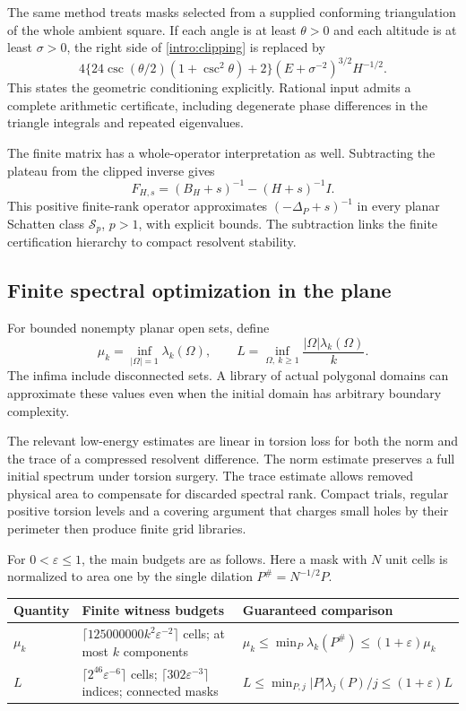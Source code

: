 \documentclass[11pt,reqno]{amsart}
\numberwithin{equation}{section}
\newcommand{\abs}[1]{\lvert#1\rvert}
\begin{document}
The same method treats masks selected from a supplied conforming
triangulation of the whole ambient square. If each angle is at least
\(\theta>0\) and each altitude is at least \(\sigma>0\), the right
side of \eqref{intro:clipping} is replaced by
\[
 4\{24\csc(\theta/2)(1+\csc^2\theta)+2\}
       (E+\sigma^{-2})^{3/2}H^{-1/2}.
\]
This states the geometric conditioning explicitly. Rational input
admits a complete arithmetic certificate, including degenerate phase
differences in the triangle integrals and repeated eigenvalues.

The finite matrix has a whole-operator interpretation as well.
Subtracting the plateau from the clipped inverse gives
\[
 F_{H,s}=(B_H+s)^{-1}-(H+s)^{-1}I.
\]
This positive finite-rank operator approximates
\((-\Delta_P+s)^{-1}\) in every planar Schatten class
\(\mathcal S_p\), \(p>1\), with explicit bounds. The subtraction
links the finite certification hierarchy to compact resolvent
stability.

\subsection*{Finite spectral optimization in the plane}

For bounded nonempty planar open sets, define
\begin{equation}\label{intro:optima}
 \mu_k=\inf_{\abs\Omega=1}\lambda_k(\Omega),\qquad
 L=\inf_{\Omega,\ k\ge1}
          \frac{\abs\Omega\lambda_k(\Omega)}{k}.
\end{equation}
The infima include disconnected sets. A library of actual
polygonal domains can approximate these values even when the
initial domain has arbitrary boundary complexity.

The relevant low-energy estimates are linear in torsion loss for
both the norm and the trace of a compressed resolvent difference.
The norm estimate preserves a full initial spectrum under torsion
surgery. The trace estimate allows removed physical area to
compensate for discarded spectral rank. Compact trials, regular
positive torsion levels and a covering argument that charges small
holes by their perimeter then produce finite grid libraries.

For \(0<\varepsilon\le1\), the main budgets are as follows.
Here a mask with \(N\) unit cells is normalized to area one by
the single dilation \(P^\#=N^{-1/2}P\).
\begin{center}
\small
\begin{tabular}{@{}p{}p{}p{}@{}}
\toprule
Quantity & Finite witness budgets & Guaranteed comparison\\
\midrule
\(\mu_k\) &
\(\lceil125000000k^2\varepsilon^{-2}\rceil\) cells;
at most \(k\) components &
\(\mu_k\le\min_P\lambda_k(P^\#)\le(1+\varepsilon)\mu_k\)\\[5pt]
\(L\) &
\(\lceil2^{46}\varepsilon^{-6}\rceil\) cells;
\(\lceil302\varepsilon^{-3}\rceil\) indices;
connected masks &
\(L\le\min_{P,j}\abs P\lambda_j(P)/j\le(1+\varepsilon)L\)\\
\bottomrule
\end{tabular}
\end{center}
\end{document}
